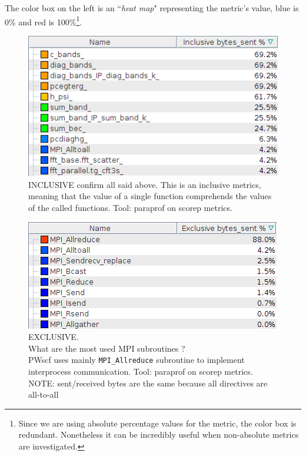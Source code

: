 \documentclass[a4paper,12pt]{article}
\begin{document}
The color box on the left is an ``\textit{heat map}" representing the metric's value, blue is 0\% and red is 100\%\footnote{Since we are using absolute percentage values for the metric, the color box is redundant. Nonetheless it can be incredibly useful when non-absolute metrics are investigated.}.




\newpage
\begin{figure}[hhh!]
	\centerline{\includegraphics[scale=0.5]{mpi_inclusive_bytes_sent.png}}
	\caption{ INCLUSIVE confirm all said above. This is an inclusive metrics, meaning that the value of a single function comprehends the values of the called functions. Tool: paraprof on scorep metrics.
	}
	\label{fig:MPIinclusive}
\end{figure}

\begin{figure}[hhh!]
	\centerline{\includegraphics[scale=0.5]{mpi_exclusive_bytes_sent.png}}
	\caption{ EXCLUSIVE. 
	\\ What are the most used MPI subroutines ? 
	\\ PWscf uses mainly \texttt{MPI\_Allreduce} subroutine to implement interprocess communication. Tool: paraprof on scorep metrics.
	\\ NOTE: sent/received bytes are the same because all directives are all-to-all
	}
	\label{fig:MPIinclusive}
\end{figure}
\end{document}

